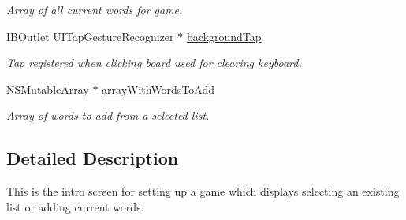\begin{DoxyCompactItemize}
\begin{DoxyCompactList}\small\item\em Array of all current words for game. \end{DoxyCompactList}\item 
\hypertarget{interface_home_screen_a7181333f6625624349015aae1b87da0f}{I\+B\+Outlet U\+I\+Tap\+Gesture\+Recognizer $\ast$ \hyperlink{interface_home_screen_a7181333f6625624349015aae1b87da0f}{background\+Tap}}\label{interface_home_screen_a7181333f6625624349015aae1b87da0f}

\begin{DoxyCompactList}\small\item\em Tap registered when clicking board used for clearing keyboard. \end{DoxyCompactList}\item 
\hypertarget{interface_home_screen_a0718307065efa6cef54e58589cdb99f5}{N\+S\+Mutable\+Array $\ast$ \hyperlink{interface_home_screen_a0718307065efa6cef54e58589cdb99f5}{array\+With\+Words\+To\+Add}}\label{interface_home_screen_a0718307065efa6cef54e58589cdb99f5}

\begin{DoxyCompactList}\small\item\em Array of words to add from a selected list. \end{DoxyCompactList}\end{DoxyCompactItemize}


\subsection{Detailed Description}
This is the intro screen for setting up a game which displays selecting an existing list or adding current words. 

